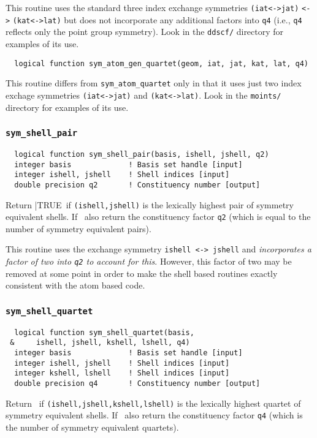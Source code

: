 This routine uses the standard three index exchange symmetries
\verb+(iat<->jat)+ \verb+<->+ \verb+(kat<->lat)+ but does not
incorporate any additional factors into \verb+q4+ (i.e., \verb+q4+
reflects only the point group symmetry).  Look in the \verb+ddscf/+
directory for examples of its use.

\begin{verbatim}
  logical function sym_atom_gen_quartet(geom, iat, jat, kat, lat, q4)
\end{verbatim}
This routine differs from \verb+sym_atom_quartet+ only in that it
uses just two index exchage symmetries \verb+(iat<->jat)+ and
\verb+(kat<->lat)+.  Look in the \verb+moints/+ directory for examples
of its use.

\subsubsection{{\tt sym\_shell\_pair}}
\begin{verbatim}
  logical function sym_shell_pair(basis, ishell, jshell, q2)
  integer basis             ! Basis set handle [input]
  integer ishell, jshell    ! Shell indices [input]
  double precision q2       ! Constituency number [output]
\end{verbatim}
Return |TRUE\ if \verb+(ishell,jshell)+ is the lexically highest pair
of symmetry equivalent shells. If \TRUE\, also return the constituency
factor \verb+q2+ (which is equal to the number of symmetry equivalent
pairs).

This routine uses the exchange symmetry \verb+ishell <-> jshell+ and
{\em incorporates a factor of two into \verb+q2+ to account for this}.
However, this factor of two may be removed at some point in order to
make the shell based routines exactly consistent with the atom based
code.

\subsubsection{{\tt sym\_shell\_quartet}}
\begin{verbatim}
  logical function sym_shell_quartet(basis,
 &     ishell, jshell, kshell, lshell, q4)
  integer basis             ! Basis set handle [input]
  integer ishell, jshell    ! Shell indices [input]
  integer kshell, lshell    ! Shell indices [input]
  double precision q4       ! Constituency number [output]
\end{verbatim}
Return \TRUE\ if \verb+(ishell,jshell,kshell,lshell)+ is the lexically highest
quartet of symmetry equivalent shells. If \TRUE\ also return the
constituency factor \verb+q4+ (which is the number of symmetry
equivalent quartets).

